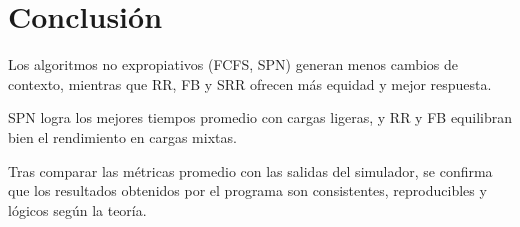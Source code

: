 \documentclass[12pt]{article}
\begin{document}
\section*{Conclusión}

Los algoritmos no expropiativos (FCFS, SPN) generan menos cambios de contexto, mientras que RR, FB y SRR ofrecen más equidad y mejor respuesta.  

SPN logra los mejores tiempos promedio con cargas ligeras, y RR y FB equilibran bien el rendimiento en cargas mixtas.  

Tras comparar las métricas promedio con las salidas del simulador, se confirma que los resultados obtenidos por el programa son consistentes, reproducibles y lógicos según la teoría.
\end{document}
